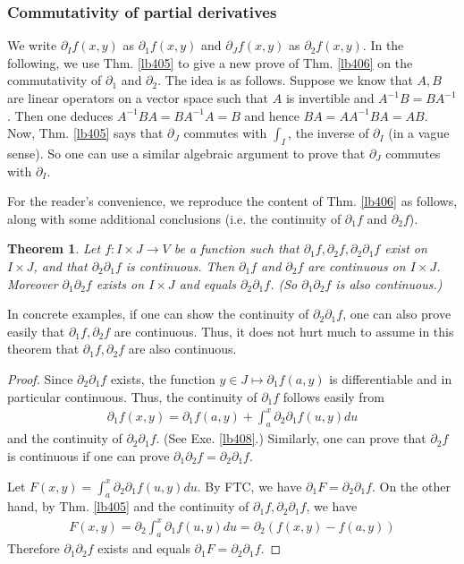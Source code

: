 \documentclass[12pt,b5paper,notitlepage]{article}
\theoremstyle{definition}
\theoremstyle{plain}
\newtheorem{thm}[df]{Theorem}
\newcommand{\dps}{\displaystyle}
\numberwithin{equation}{section}
\begin{document}
\subsubsection{Commutativity of partial derivatives}


We write $\partial_If(x,y)$ as $\partial_1f(x,y)$ and $\partial_Jf(x,y)$ as $\partial_2f(x,y)$. In the following, we use Thm. \ref{lb405} to give a new prove of Thm. \ref{lb406} on the commutativity of $\partial_1$ and $\partial_2$. The idea is as follows. Suppose we know that $A,B$ are linear operators on a vector space such that $A$ is invertible and $A^{-1}B=BA^{-1}$. Then one deduces $A^{-1}BA=BA^{-1}A=B$ and hence $BA=AA^{-1}BA=AB$. Now, Thm. \ref{lb405} says that $\partial_J$  commutes with $\int_I$, the inverse of $\partial_I$ (in a vague sense). So one can use a similar algebraic argument to prove that $\partial_J$ commutes with $\partial_I$.

For the reader's convenience, we reproduce the content of Thm. \ref{lb406} as follows, along with some additional conclusions (i.e. the continuity of $\partial_1f$ and $\partial_2f$).


\begin{thm}\label{lb407}
Let $f:I\times J\rightarrow V$ be a function such that $\partial_1f,\partial_2f,\partial_2\partial_1f$ exist on $I\times J$, and that $\partial_2\partial_1f$ is continuous. Then $\partial_1f$ and $\partial_2f$ are continuous on $I\times J$. Moreover $\partial_1\partial_2f$ exists on $I\times J$ and equals $\partial_2\partial_1f$. (So $\partial_1\partial_2f$ is also continuous.)
\end{thm}


In concrete examples, if one can show the continuity of $\partial_2\partial_1f$, one can also prove easily that $\partial_1f,\partial_2f$ are continuous. Thus, it does not hurt much to assume in this theorem that $\partial_1f,\partial_2f$ are also continuous.


\begin{proof}
Since $\partial_2\partial_1f$ exists, the function $y\in J\mapsto\partial_1f(a,y)$ is differentiable and in particular continuous. Thus, the continuity of $\partial_1f$ follows easily from
\begin{align*}
\partial_1f(x,y)=\partial_1f(a,y)+\int_a^x\partial_2\partial_1f(u,y)du
\end{align*}
and the continuity of $\partial_2\partial_1f$. (See Exe. \ref{lb408}.) Similarly, one can prove that $\partial_2f$ is continuous if one can prove $\partial_1\partial_2f=\partial_2\partial_1f$. 

Let $\dps F(x,y)=\int_a^x\partial_2\partial_1 f(u,y)du$. By FTC, we have $\partial_1F=\partial_2\partial_1f$. On the other hand, by Thm. \ref{lb405} and the continuity of $\partial_1f,\partial_2\partial_1f$, we have
\begin{align*}
F(x,y)=\partial_2\int_a^x\partial_1f(u,y)du=\partial_2(f(x,y)-f(a,y))
\end{align*}
Therefore $\partial_1\partial_2f$ exists and equals $\partial_1F=\partial_2\partial_1f$.
\end{proof}
\end{document}
